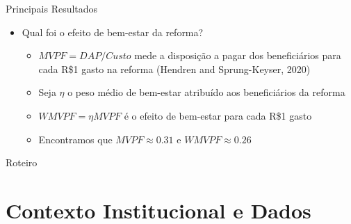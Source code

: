 \begin{frame}[label=mainResults]{Principais Resultados}
\begin{itemize}
    \item Qual foi o efeito de bem-estar da reforma?
    \begin{itemize}
        \item $MVPF=DAP/Custo$ mede a disposição a pagar dos beneficiários para cada R\$1 gasto na reforma (Hendren and Sprung-Keyser, 2020)
        \item Seja $\eta$ o peso médio de bem-estar atribuído aos beneficiários da reforma
        \item $WMVPF = \eta MVPF$ é o efeito de bem-estar para cada R\$1 gasto
        \item Encontramos que $MVPF \approx 0.31$ e $WMVPF\approx 0.26$
    \end{itemize}
\end{itemize}
\end{frame}

\begin{frame}{Roteiro}
  \tableofcontents
\end{frame}

\section{Contexto Institucional e Dados}

